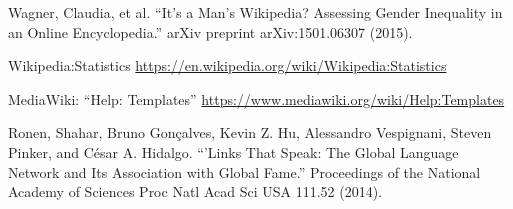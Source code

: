 \documentclass[11pt]{report}
\begin{document}
\begin{thebibliography}{1}
     Wagner, Claudia, et al. ``It's a Man's Wikipedia? Assessing Gender Inequality in an Online Encyclopedia.'' arXiv preprint arXiv:1501.06307 (2015).

     Wikipedia:Statistics 
    \url{https://en.wikipedia.org/wiki/Wikipedia:Statistics}

     MediaWiki: ``Help: Templates''
    \url{https://www.mediawiki.org/wiki/Help:Templates}

     Ronen, Shahar, Bruno Gonçalves, Kevin Z. Hu, Alessandro Vespignani, Steven Pinker, and César A. Hidalgo. ``'Links That Speak: The Global Language Network and Its Association with Global Fame.'' Proceedings of the National Academy of Sciences Proc Natl Acad Sci USA 111.52 (2014).

\end{thebibliography}
\end{document}
